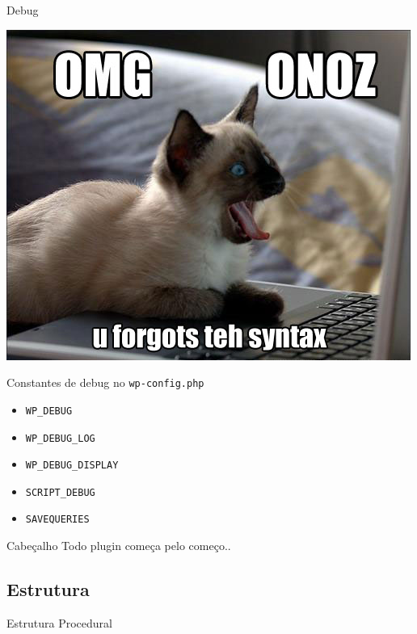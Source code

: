 \documentclass{beamer}
\begin{document}
\begin{frame}{Debug}
\begin{center}
  \includegraphics[height=0.8\textheight]{./img/debug.jpg}
\end{center}
\end{frame}

\begin{frame}{Constantes de debug no \texttt{wp-config.php}}
\begin{itemize}
  \item \pause \texttt{WP\_DEBUG}
  \item \pause \texttt{WP\_DEBUG\_LOG}
  \item \pause \texttt{WP\_DEBUG\_DISPLAY}
  \item \pause \texttt{SCRIPT\_DEBUG}
  \item \pause \texttt{SAVEQUERIES}
\end{itemize}
\end{frame}

\begin{frame}{Cabeçalho}
  \pause Todo plugin começa pelo começo..
  \pause 
\end{frame}

\subsection{Estrutura}

\begin{frame}{Estrutura Procedural}
  \pause 
\end{frame}
\end{document}
